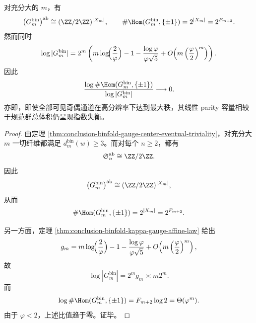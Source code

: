 \begin{corollary}[线性奇偶容量与规范体积的指数失衡]\label{cor:conclusion-binfold-linear-parity-volume-imbalance}
对充分大的 \(m\)，有
\[
\bigl(G_m^{\mathrm{bin}}\bigr)^{\mathrm{ab}}\cong (\ZZ/2\ZZ)^{|X_m|},
\qquad
\#\Hom(G_m^{\mathrm{bin}},\{\pm1\})=2^{|X_m|}=2^{F_{m+2}}.
\]
然而同时
\[
\log |G_m^{\mathrm{bin}}|
=
2^m\left(
m\log\!\Bigl(\frac{2}{\varphi}\Bigr)
-1-\frac{\log\varphi}{\varphi\sqrt5}
+O\!\left(m\left(\frac{\varphi}{2}\right)^m\right)
\right).
\]
因此
\[
\frac{\log \#\Hom(G_m^{\mathrm{bin}},\{\pm1\})}{\log |G_m^{\mathrm{bin}}|}
\longrightarrow 0.
\]
亦即，即使全部可见奇偶通道在高分辨率下达到最大秩，其线性 parity 容量相较于规范群总体积仍呈现指数失衡。
\end{corollary}
\begin{proof}
由定理 \ref{thm:conclusion-binfold-gauge-center-eventual-triviality}，对充分大 \(m\) 一切纤维都满足 \(d_m^{\mathrm{bin}}(w)\ge 3\)。而对每个 \(n\ge 2\)，都有
\[
\mathfrak S_n^{\mathrm{ab}}\cong \ZZ/2\ZZ.
\]
因此
\[
\bigl(G_m^{\mathrm{bin}}\bigr)^{\mathrm{ab}}
\cong
(\ZZ/2\ZZ)^{|X_m|},
\]
从而
\[
\#\Hom(G_m^{\mathrm{bin}},\{\pm1\})
=
2^{|X_m|}
=
2^{F_{m+2}}.
\]

另一方面，定理 \ref{thm:conclusion-binfold-kappa-gauge-affine-law} 给出
\[
g_m
=
m\log\!\Bigl(\frac{2}{\varphi}\Bigr)
-1-\frac{\log\varphi}{\varphi\sqrt5}
+O\!\left(m\left(\frac{\varphi}{2}\right)^m\right),
\]
故
\[
\log |G_m^{\mathrm{bin}}|=2^m g_m\asymp m2^m.
\]
而
\[
\log \#\Hom(G_m^{\mathrm{bin}},\{\pm1\})
=
F_{m+2}\log 2
=
\Theta(\varphi^m).
\]
由于 \(\varphi<2\)，上述比值趋于零。证毕。
\end{proof}

